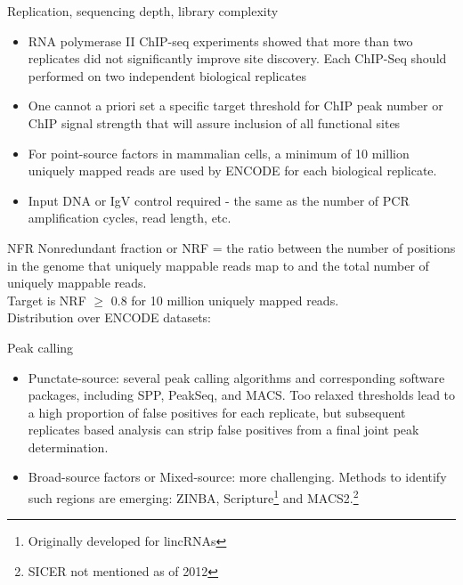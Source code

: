 \documentclass{beamer}
\begin{document}
\begin{frame}{Replication, sequencing depth, library complexity}
\begin{itemize}
\item RNA polymerase II ChIP-seq experiments showed that more than two replicates did not significantly improve site discovery. Each ChIP-Seq should performed on two independent biological replicates
\item One cannot a priori set a specific target threshold for ChIP peak number or ChIP signal strength that will assure inclusion of all functional sites
\item For point-source factors in mammalian cells, a minimum of 10 million uniquely mapped reads are used by ENCODE for each biological replicate.
\item Input DNA or IgV control required - the same as the number of PCR amplification cycles, read length, etc.
\end{itemize}
\end{frame}

\begin{frame}{NFR}
Nonredundant fraction or NRF = the ratio between the number of positions in the genome that uniquely mappable reads map to and the total number of uniquely mappable reads. \\
Target is NRF $\geq$ 0.8 for 10 million uniquely mapped reads.\\
Distribution over ENCODE datasets:\\
\end{frame}

\begin{frame}{Peak calling}
\begin{itemize}
\item Punctate-source: several peak calling algorithms and corresponding software packages, including SPP, PeakSeq, and MACS. Too relaxed thresholds lead to a high proportion of false positives for each replicate, but subsequent replicates based analysis can strip false positives from a final joint peak determination.
\item Broad-source factors or Mixed-source: more challenging. Methods to identify such regions are emerging: ZINBA, Scripture\footnote{Originally developed for lincRNAs} and MACS2.\footnote{SICER not mentioned as of 2012}
\end{itemize}
\end{frame}
\end{document}
